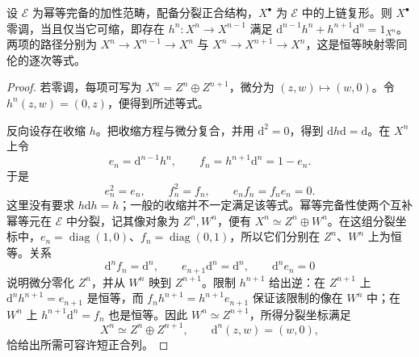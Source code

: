 \begin{proposition}\label{b4:prop:B-split-acyclic-contractible}
	设 \(\mathcal E\) 为幂等完备的加性范畴，配备分裂正合结构，\(X^\bullet\) 为 \(\mathcal E\) 中的上链复形。则 \(X^\bullet\) 零调，当且仅当它可缩，即存在 \(h^n:X^n\rightarrow X^{n-1}\) 满足 \(\mathrm{d}^{n-1}h^n+h^{n+1}\mathrm{d}^n=1_{X^n}\)。两项的路径分别为 \(X^n\to X^{n-1}\to X^n\) 与 \(X^n\to X^{n+1}\to X^n\)，这是恒等映射零同伦的逐次等式。
\end{proposition}
\begin{proof}
	若零调，每项可写为 \(X^n=Z^n\oplus Z^{n+1}\)，微分为 \((z,w)\mapsto(w,0)\)。令 \(h^n(z,w)=(0,z)\)，便得到所述等式。

	反向设存在收缩 \(h\)。把收缩方程与微分复合，并用 \(\mathrm{d}^2=0\)，得到 \(\mathrm{d}h\mathrm{d}=\mathrm{d}\)。在 \(X^n\) 上令
	\[
		e_n=\mathrm{d}^{n-1}h^n,\qquad f_n=h^{n+1}\mathrm{d}^n=1-e_n.
	\]
	于是
	\[
		e_n^2=e_n,\qquad f_n^2=f_n,\qquad e_nf_n=f_ne_n=0.
	\]
	这里没有要求 \(h\mathrm{d}h=h\)；一般的收缩并不一定满足该等式。幂等完备性使两个互补幂等元在 \(\mathcal E\) 中分裂，记其像对象为 \(Z^n,W^n\)，便有 \(X^n\simeq Z^n\oplus W^n\)。在这组分裂坐标中，\(e_n=\operatorname{diag}(1,0)\)、\(f_n=\operatorname{diag}(0,1)\)，所以它们分别在 \(Z^n\)、\(W^n\) 上为恒等。关系
	\[
		\mathrm{d}^nf_n=\mathrm{d}^n, \qquad e_{n+1}\mathrm{d}^n=\mathrm{d}^n, \qquad \mathrm{d}^ne_n=0
	\]
	说明微分零化 \(Z^n\)，并从 \(W^n\) 映到 \(Z^{n+1}\)。限制 \(h^{n+1}\) 给出逆：在 \(Z^{n+1}\) 上 \(\mathrm{d}^nh^{n+1}=e_{n+1}\) 是恒等，而 \(f_nh^{n+1}=h^{n+1}e_{n+1}\) 保证该限制的像在 \(W^n\) 中；在 \(W^n\) 上 \(h^{n+1}\mathrm{d}^n=f_n\) 也是恒等。因此 \(W^n\simeq Z^{n+1}\)，所得分裂坐标满足
	\[
		X^n\simeq Z^n\oplus Z^{n+1}, \qquad \mathrm{d}^n(z,w)=(w,0),
	\]
	恰给出所需可容许短正合列。
\end{proof}

